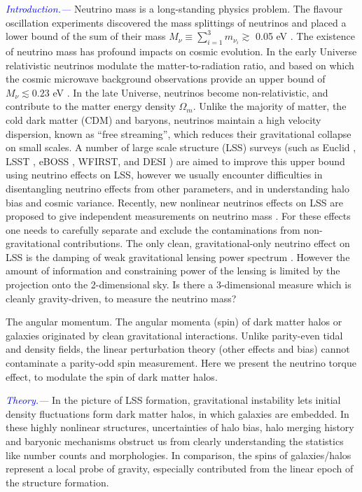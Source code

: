 \documentclass[aps,prd,twocolumn,amsmath,amssymb,amsfont,superscriptaddress]{revtex4-1}
\newcommand{\tcb}{\textcolor{blue}}
\begin{document}
\tcb{\textit{Introduction.---}}
Neutrino mass is a long-standing physics problem. 
The flavour oscillation experiments \citep{2002PhRvL..89a1301A} discovered the mass splittings of neutrinos and placed a lower bound of the sum of their mass $M_\nu \equiv \sum_{i=1}^3 m_{\nu_i} \gtrsim$ 0.05 eV \citep{2014ChPhC..38i0001O}. 
The existence of neutrino mass has profound impacts on cosmic evolution. 
In the early Universe relativistic neutrinos modulate the matter-to-radiation ratio, and based on which the cosmic microwave background observations provide an upper bound of $M_\nu\lesssim 0.23$ eV \citep{2016A&A...594A..13P}. 
In the late Universe, neutrinos become non-relativistic, and contribute to the matter energy density $\Omega_m$. 
Unlike the majority of matter, the cold dark matter (CDM) and baryons, neutrinos maintain a high velocity dispersion, known as ``free streaming'', which reduces their gravitational collapse on small scales. 
A number of large scale structure (LSS) surveys 
(such as Euclid \cite{2011arXiv1110.3193L},
LSST \cite{2009arXiv0912.0201L}, eBOSS \cite{2016AJ....151...44D}, WFIRST\cite{2012SPIE.8442E..1UG}, and DESI \cite{2015AAS...22533605E}) are aimed to improve this upper bound using neutrino effects on LSS, however we usually encounter difficulties in disentangling neutrino effects from other parameters, and in understanding halo bias and cosmic variance. Recently, new nonlinear neutrinos effects on LSS are proposed to give independent measurements on neutrino mass \citep{2014PhRvL.113m1301Z,2016PhRvL.116n1301Z,2017NatAs...1E.143Y}. 
For these effects one needs to carefully separate and exclude the contaminations from non-gravitational contributions. The only clean, gravitational-only neutrino effect on LSS is the damping of weak gravitational lensing power spectrum \citep{2016A&A...594A..13P}. However the amount of information and constraining power of the lensing is limited by the projection onto the 2-dimensional sky. Is there a 3-dimensional measure which is cleanly gravity-driven, to measure the neutrino mass?

The angular momentum. The angular momenta (spin) of dark matter halos or galaxies originated by clean gravitational interactions. 
Unlike parity-even tidal and density fields, the linear perturbation theory (other effects and bias) cannot contaminate a parity-odd spin measurement. 
Here we present the neutrino torque effect, to modulate the spin of dark matter halos.

\tcb{\textit{Theory.---}} 
In the picture of LSS formation, gravitational instability lets initial density fluctuations form dark matter halos, in which galaxies are embedded.
In these highly nonlinear structures, uncertainties of halo bias, halo merging history and baryonic mechanisms obstruct us from clearly understanding the statistics like number counts and morphologies.
In comparison, the spins of galaxies/halos represent a local probe of gravity, especially contributed from the linear epoch of the structure formation. 
\end{document}
